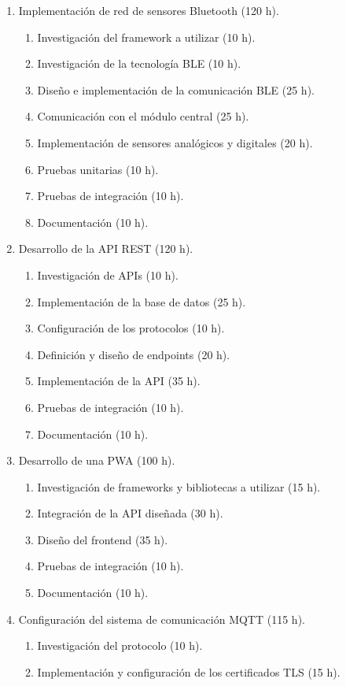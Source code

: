 \documentclass[
11pt, %
]{charter}
\begin{document}
\begin{enumerate}
\item Implementación de red de sensores Bluetooth (120 h).
	\begin{enumerate}
	\item Investigación del framework a utilizar (10 h).
	\item Investigación de la tecnología BLE (10 h).
	\item Diseño e implementación de la comunicación BLE (25 h).
	\item Comunicación con el módulo central (25 h).
	\item Implementación de sensores analógicos y digitales (20 h).
	\item Pruebas unitarias (10 h).
	\item Pruebas de integración (10 h).
	\item Documentación (10 h).
	\end{enumerate}
\item Desarrollo de la API REST (120 h).
	\begin{enumerate}
	\item Investigación de APIs (10 h).
	\item Implementación de la base de datos (25 h).
	\item Configuración de los protocolos (10 h).
	\item Definición y diseño de endpoints (20 h).
	\item Implementación de la API (35 h).
	\item Pruebas de integración (10 h).
	\item Documentación (10 h).
	\end{enumerate}
\item Desarrollo de una PWA (100 h).
	\begin{enumerate}
	\item Investigación de frameworks y bibliotecas a utilizar (15 h).
	\item Integración de la API diseñada (30 h).
	\item Diseño del frontend (35 h).
	\item Pruebas de integración (10 h).
	\item Documentación (10 h).
	\end{enumerate}
\item Configuración del sistema de comunicación MQTT (115 h).
	\begin{enumerate}
	\item Investigación del protocolo (10 h).
	\item Implementación y configuración de los certificados TLS (15 h).

\end{enumerate}
\end{enumerate}
\end{document}
